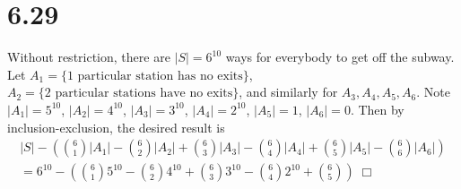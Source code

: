 \documentclass{article}
\begin{document}
\section*{6.29}
Without restriction, there are $|S| = 6^{10}$ ways for everybody to get off the subway.\\
Let $A_1 = \{\text{1 particular station has no exits}\}$, $A_2 = \{\text{2 particular stations have no exits}\}$, and similarly for $A_3, A_4, A_5, A_6$. Note $|A_1| = 5^{10}$, $|A_2| = 4^{10}$, $|A_3| = 3^{10}$, $|A_4| = 2^{10}$, $|A_5| = 1$, $|A_6| = 0$. Then by inclusion-exclusion, the desired result is
\begin{gather*}
|S| - \left( \binom{6}{1}|A_1| - \binom{6}{2}|A_2| + \binom{6}{3}|A_3| - \binom{6}{4}|A_4| + \binom{6}{5}|A_5| - \binom{6}{6}|A_6| \right)\\
= 6^{10} - \left( \binom{6}{1}5^{10} - \binom{6}{2}4^{10} + \binom{6}{3}3^{10} - \binom{6}{4}2^{10} + \binom{6}{5} \right) \; \Box
\end{gather*}
\end{document}

